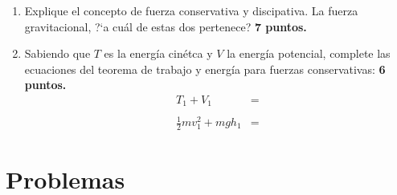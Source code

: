 \documentclass[]{article}
\begin{document}
\begin{enumerate}
\begin{multicols}{4}
\begin{align*}
\boldsymbol{A_{x}} &= A\cos(\theta) \\
\boldsymbol{A_{y}} &= A\sin(\theta)
\end{align*}

\begin{align*}
\boldsymbol{A_{x}} &= A\cos(\theta) \\
\boldsymbol{A_{x}} &= \boldsymbol{A_{y}} 
\end{align*}
\end{multicols}

\item Explique el concepto de fuerza conservativa y discipativa. La fuerza
gravitacional, ?`a cuál de estas dos pertenece?
\hfill \textbf{7 puntos.}

\item Sabiendo que $T$ es la energ\'ia cin\'etca y $V$ la energ\'ia potencial,
complete las ecuaciones del teorema de trabajo y energ\'ia para fuerzas
conservativas:
\hfill \textbf{6 puntos.}
\begin{align*}
T_{1} + V_{1} &=  \\ \nonumber \\
\frac{1}{2}mv^{2}_{1} + mgh_{1} &= 
\end{align*}


\end{enumerate}


\section*{Problemas} %
\label{sec:problemas}
\end{document}
